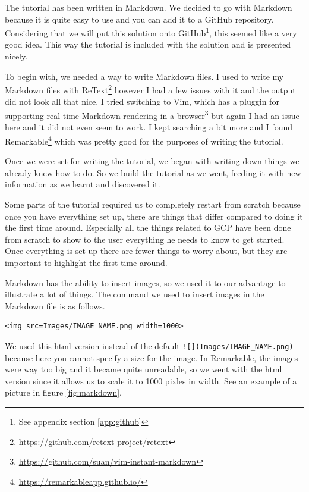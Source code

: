 
The tutorial has been written in Markdown. We decided to go with
Markdown because it is quite easy to use and you can add it to a
GitHub repository.  Considering that we will put this solution onto
GitHub\footnote{See appendix section \ref{app:github}}, this seemed
like a very good idea. This way the tutorial is included with the
solution and is presented nicely.

To begin with, we needed a way to write Markdown files. I used to
write my Markdown files with
ReText\footnote{\url{https://github.com/retext-project/retext}}
however I had a few issues with it and the output did not look all
that nice. I tried switching to Vim, which has a pluggin for
supporting real-time Markdown rendering in a
browser\footnote{\url{https://github.com/suan/vim-instant-markdown}}
but again I had an issue here and it did not even seem to work. I kept
searching a bit more and I found
Remarkable\footnote{\url{https://remarkableapp.github.io/}} which was
pretty good for the purposes of writing the tutorial.

Once we were set for writing the tutorial, we began with writing down
things we already knew how to do. So we build the tutorial as we went,
feeding it with new information as we learnt and discovered it.

Some parts of the tutorial required us to completely restart from
scratch because once you have everything set up, there are things that
differ compared to doing it the first time around. Especially all the
things related to GCP have been done from scratch to show to the user
everything he needs to know to get started. Once everything is set up
there are fewer things to worry about, but they are important to
highlight the first time around.

Markdown has the ability to insert images, so we used it to our
advantage to illustrate a lot of things. The command we used to insert
images in the Markdown file is as follows.

\begin{verbatim}
<img src=Images/IMAGE_NAME.png width=1000>
\end{verbatim}

We used this html version instead of the default
\verb|![](Images/IMAGE_NAME.png)| because here you cannot specify a
size for the image. In Remarkable, the images were way too big and it
became quite unreadable, so we went with the html version since it
allows us to scale it to 1000 pixles in width. See an example of a
picture in figure \ref{fig:markdown}.

